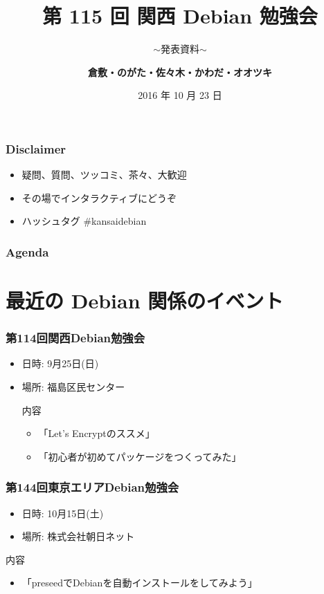 \documentclass[cjk,dvipdfmx,10pt,compress,%
hyperref={bookmarks=true,bookmarksnumbered=true,bookmarksopen=false,%
colorlinks=false,%
pdftitle={第 115 回 関西 Debian 勉強会},%
pdfauthor={倉敷・のがた・佐々木・かわだ・オオツキ},%
pdfsubject={資料},%
}]{beamer}
\title{第 115 回 関西 Debian 勉強会}
\subtitle{$\sim$発表資料$\sim$}
\author[かわだ てつたろう]{{\large\bf 倉敷・のがた・佐々木・かわだ・オオツキ}}
\institute[Debian JP]{{\normalsize\tt 関西 Debian 勉強会}}
\date{{\small 2016 年 10 月 23 日}}
\begin{document}
\settitleslide
\begin{frame}
\titlepage
\end{frame}
\setdefaultslide

\begin{frame}[fragile]
  \frametitle{Disclaimer}
  \begin{itemize}
  \item 疑問、質問、ツッコミ、茶々、\alert{大歓迎}
  \item その場でインタラクティブにどうぞ
  \item ハッシュタグ \#kansaidebian
  \end{itemize}
\end{frame}

\begin{frame}[fragile]
\frametitle{Agenda}

\tableofcontents

\end{frame}

\section{最近の Debian 関係のイベント}

\begin{frame}[fragile]
  \frametitle{第114回関西Debian勉強会}
  \begin{itemize}
  \item 日時: 9月25日(日)
  \item 場所: 福島区民センター
  \begin{block}{内容}
    \begin{itemize}
    \item 「Let's Encryptのススメ」
    \item 「初心者が初めてパッケージをつくってみた」
    \end{itemize}
  \end{block}
\end{itemize}
\end{frame}

\begin{frame}[fragile]
  \frametitle{第144回東京エリアDebian勉強会}
  \begin{itemize}
  \item 日時: 10月15日(土)
  \item 場所: 株式会社朝日ネット
  \end{itemize}
  \begin{block}{内容}
    \begin{itemize}
    \item 「preseedでDebianを自動インストールをしてみよう」
    \end{itemize}
  \end{block}
\end{frame}
\end{document}

